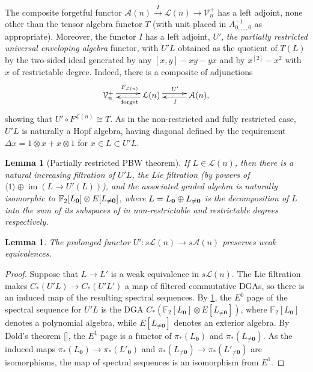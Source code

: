 \documentclass[11pt]{amsart}
\theoremstyle{plain}
\newtheorem{lem}[thm]{Lemma}
\theoremstyle{definition}
\DeclareMathOperator{\im}{im}
\renewcommand{\to}{\longrightarrow}
\newcommand{\calA}{\mathcal{A}}
\newcommand{\calL}{\mathcal{L}}
\newcommand{\calV}{\mathcal{V}}
\theoremstyle{plain}
\newcommand{\restn}[1]{#1^{[2]}}
\newcommand{\vect}[2]{\calV^{#1}_{#2}}
\newcommand{\UEA}{U'}%
\newcommand{\F}{\mathbb{F}}
\begin{document}
\begin{appendices}
The composite forgetful functor $\calA(n)\overset{I}{\to}\calL(n)\to\vect{+}{n}$ has a left adjoint, none other than the tensor algebra functor $T$ (with unit placed in $A^{-1}_{0,\ldots,0}$ as appropriate). Moreover, the functor $I$ has a left adjoint, $\UEA$, \emph{the partially restricted universal enveloping algebra} functor, with $\UEA L$ obtained as the quotient of $T(L)$ by the two-sided ideal generated by any $[x,y]-xy-yx$ and by $\restn{x}-x^2$ with $x$ of restrictable degree. Indeed, there is a composite of adjunctions
\[\xymatrix@R=.3cm@C=1cm{
\vect{+}{n}  \ar@<.6ex>[r]^{F_{\calL(n)}}&
\calL(n)  \ar@<.4ex>[l]^{\textup{forget}} \ar@<.6ex>[r]^{\UEA}&
\calA(n),  \ar@<.4ex>[l]^{I} 
}
\]
showing that $\UEA\circ F^{\calL(n)}\cong T$. As in the non-restricted and fully restricted case, $\UEA L$ is naturally a Hopf algebra, having diagonal defined by the requirement $\Delta x=1\otimes x+x\otimes 1$ for $x\in L\subset \UEA L$.
\begin{lem}[Partially restricted PBW theorem]\label{Partially restricted PBW theorem}
If $L\in\calL(n)$, then there is a natural increasing filtration of $\UEA L$, the Lie filtration (by powers of $\langle 1\rangle\oplus \im(L\to \UEA(L))$), and the associated graded algebra is naturally isomorphic to $\F_2[L_{\textup{\textbf{0}}}]\otimes E[L_{\neq\textup{\textbf{0}}}]$, where $L=L_{\textbf{\textup{0}}}\oplus L_{\neq\textbf{\textup{0}}}$ is the decomposition of $L$ into the sum of its subspaces of in non-restrictable and restrictable degrees respectively.
\end{lem}
\begin{lem}
The prolonged functor $\UEA:s\calL(n)\to s\calA(n)$ preserves weak equivalences.
\end{lem}
\begin{proof}
Suppose that $L\to L'$ is a weak equivalence in $s\calL(n)$. The Lie filtration makes $C_*(\UEA L)\to C_*(\UEA L')$ a map of filtered commutative DGAs, so there is an induced map of the resulting spectral sequences. By \ref{Partially restricted PBW theorem}, the $E^0$ page of the spectral sequence for $\UEA L$ is the DGA $C_*(\F_2[L_{\textbf{0}}]\otimes E[L_{\neq\textbf{0}}])$, where $\F_2[L_{\textbf{0}}]$ denotes a polynomial algebra, while $E[L_{\neq\textbf{0}}]$ denotes an exterior algebra. By Dold's theorem [], the $E^1$ page is a functor of $\pi_*(L_{\textbf{0}})$ and $\pi_*(L_{\neq\textbf{0}})$. As the induced maps $\pi_*(L_{\textbf{0}})\to\pi_*(L'_{\textbf{0}})$ and $\pi_*(L_{\neq\textbf{0}})\to\pi_*(L'_{\neq\textbf{0}})$ are isomorphisms, the map of spectral sequences is an isomorphism from $E^1$.
\end{proof}


\end{appendices}
\end{document}
